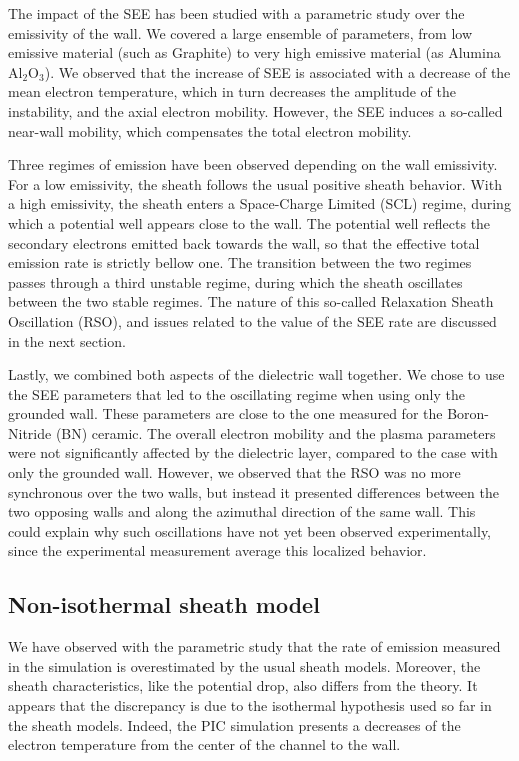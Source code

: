     The impact of the SEE has been studied with a parametric study over the emissivity of the wall.
    We covered a large ensemble of parameters, from low emissive material (such as Graphite) to very high emissive material (as Alumina Al$_2$O$_3$).
    We observed that the increase of SEE is associated with a decrease of the mean electron temperature, which in turn decreases the amplitude of the instability, and the axial electron mobility.
    However, the SEE induces a so-called near-wall mobility, which compensates the total electron mobility.

    Three regimes of emission have been observed depending on the wall emissivity.
    For a low emissivity, the sheath follows the usual positive sheath behavior.
    With a high emissivity, the sheath enters a Space-Charge Limited (SCL) regime, during which a potential well appears close to the wall.
    The potential well reflects the secondary electrons emitted back towards the wall, so that the effective total emission rate is strictly bellow one.
    The transition between the two regimes passes through a third unstable regime, during which the sheath oscillates between the two stable regimes.
    The nature of this so-called Relaxation Sheath Oscillation (RSO), and issues related to the value of the SEE rate are discussed in the next section.

    Lastly, we combined both aspects of the dielectric wall together.
    We chose to use the SEE parameters that led to the oscillating regime when using only the grounded wall.
    These parameters are close to the one measured for the Boron-Nitride (BN) ceramic.
    The overall electron mobility and the plasma parameters were not significantly affected by the dielectric layer, compared to the case with only the grounded wall.
    However, we observed that the RSO was no more synchronous over the two walls, but instead it presented differences between the two opposing walls and along the azimuthal direction of the same wall.
    This could explain why such oscillations have not yet been observed experimentally, since the experimental measurement average this localized behavior.

  \subsection{Non-isothermal sheath model}

    We have observed with the parametric study that the rate of emission measured in the simulation is overestimated by the usual sheath models.
    Moreover, the sheath characteristics, like the potential drop, also differs from the theory.
    It appears that the discrepancy is due to the isothermal hypothesis used so far in the sheath models.
    Indeed, the PIC simulation presents a decreases of the electron temperature from the center of the channel to the wall.


